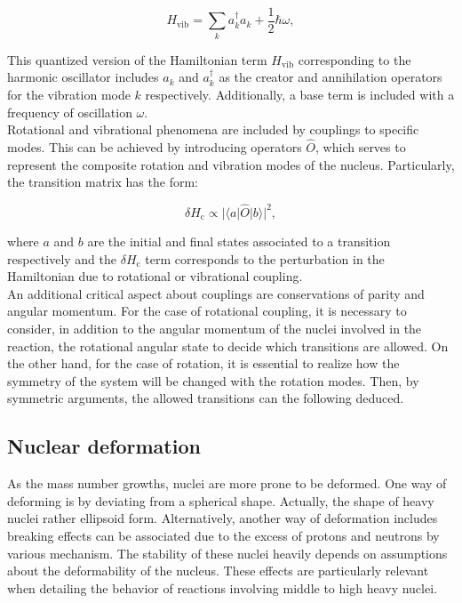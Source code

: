 \documentclass[openany]{book}
\begin{document}
\begin{equation}\label{eq:nuclearMotion_vibration}
	H_{\mathrm{vib}}	=  \sum_{k}{a_k^{\dagger}a_k}  + \frac{1}{2} \hbar \omega, 
\end{equation}

This quantized version of the Hamiltonian term $H_{\mathrm{vib}}$ corresponding to the harmonic oscillator includes $a_k$ and $a^{\dagger}_k$ as the creator and annihilation operators for the vibration mode $k$ respectively. Additionally, a base term is included with a frequency of oscillation $\omega$. \\

Rotational and vibrational phenomena are included by couplings to specific modes. This can be achieved by introducing operators $\hat O$, which serves to represent the composite rotation and vibration modes of the nucleus. Particularly, the transition matrix has the form: 

\begin{equation}\label{eq:nuclearMotion_coupling}
	\delta H_{\mathrm{c}} \propto |\langle a | \hat O| b \rangle|^{2},
\end{equation}

where $a$ and $b$ are the initial and final states associated to a transition respectively and the $	\delta H_{\mathrm{c}}$ term corresponds to the perturbation in the Hamiltonian due to rotational or vibrational coupling. \\

An additional critical aspect about couplings are conservations of parity and angular momentum. For the case of rotational coupling, it is necessary to consider, in addition to the angular momentum of the nuclei involved in the reaction, the rotational angular state to decide which transitions are allowed. On the other hand, for the case of rotation, it is essential to realize how the symmetry of the system will be changed with the rotation modes. Then, by symmetric arguments, the allowed transitions can the following deduced.  

\subsection{Nuclear deformation}  \label{sub:nuclearDeformation}

As the mass number growths, nuclei are more prone to be deformed. One way of deforming is by deviating from a  spherical shape. Actually, the shape of heavy nuclei rather ellipsoid form. Alternatively, another way of deformation includes breaking effects can be associated due to the excess of protons and neutrons by various mechanism. The stability of these nuclei heavily depends on assumptions about the deformability of the nucleus. These effects are particularly relevant when detailing the behavior of reactions involving middle to high heavy nuclei. \\
\end{document}
